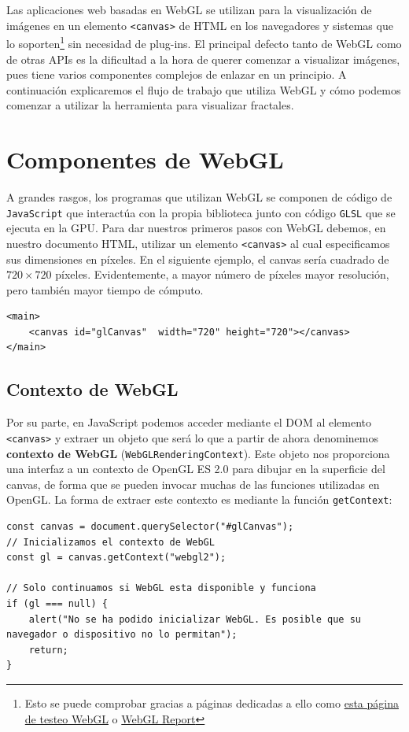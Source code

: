 Las aplicaciones web basadas en WebGL se utilizan para la visualización de imágenes en un elemento \verb|<canvas>| de HTML en los navegadores y sistemas que lo soporten\footnote{Esto se puede comprobar gracias a páginas dedicadas a ello como \href{https://get.webgl.org/}{esta página de testeo WebGL} o \href{http://webglreport.com/}{WebGL Report}} sin necesidad de plug-ins. El principal defecto tanto de WebGL como de otras APIs es la dificultad a la hora de querer comenzar a visualizar imágenes, pues tiene varios componentes complejos de enlazar en un principio. A continuación explicaremos el flujo de trabajo que utiliza WebGL y cómo podemos comenzar a utilizar la herramienta para visualizar fractales.

\section{Componentes de WebGL}
\label{section:componentes-wgl}

A grandes rasgos, los programas que utilizan WebGL se componen de código de \verb|JavaScript| que interactúa con la propia biblioteca junto con código \verb|GLSL| que se ejecuta en la GPU. Para dar nuestros primeros pasos con WebGL debemos, en nuestro documento HTML, utilizar un elemento \verb|<canvas>| al cual especificamos sus dimensiones en píxeles. En el siguiente ejemplo, el canvas sería cuadrado de $720\times 720$ píxeles. Evidentemente, a mayor número de píxeles mayor resolución, pero también mayor tiempo de cómputo.

\begin{lstlisting}
<main>
    <canvas id="glCanvas"  width="720" height="720"></canvas>
</main>
\end{lstlisting}

\subsection{Contexto de WebGL}

Por su parte, en JavaScript podemos acceder mediante el DOM al elemento \verb|<canvas>| y extraer un objeto que será lo que a partir de ahora denominemos \textbf{contexto de WebGL} (\verb|WebGLRenderingContext|). Este objeto nos proporciona una interfaz a un contexto de OpenGL ES 2.0 para dibujar en la superficie del canvas, de forma que se pueden invocar muchas de las funciones utilizadas en OpenGL. La forma de extraer este contexto es mediante la función \verb|getContext|:

\begin{lstlisting}
const canvas = document.querySelector("#glCanvas");
// Inicializamos el contexto de WebGL
const gl = canvas.getContext("webgl2");

// Solo continuamos si WebGL esta disponible y funciona
if (gl === null) {
    alert("No se ha podido inicializar WebGL. Es posible que su navegador o dispositivo no lo permitan");
    return;
}
\end{lstlisting}

